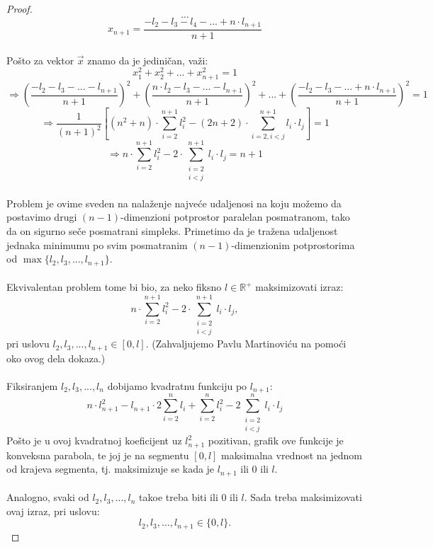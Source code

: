 \documentclass[11pt]{article}
\renewcommand{\vv}{\overrightarrow}
\begin{document}
\begin{proof}
\vspace{3pt}
$$...$$
\vspace{3pt}
$$x_{n+1}=\frac{-l_2-l_3-l_4-...+n\cdot l_{n+1}}{n+1}$$
\\
\indent Po\v sto za vektor $\vv{x}$ znamo da je jedini\v can, va\v zi:
$$x_1^2+ x_2^2+...+x_{n+1}^2=1$$
$$\Rightarrow \left(\frac{-l_2-l_3-...-l_{n+1}}{n+1}\right)^2+\left(\frac{n\cdot l_2-l_3-...-l_{n+1}}{n+1}\right)^2+...+\left(\frac{-l_2-l_3-...+n\cdot l_{n+1}}{n+1}\right)^2=1$$
$$\Rightarrow \frac{1}{(n+1)^2}\left[ (n^2+n)\cdot {\sum_{i=2}^{n+1} {l_i^2}} - (2n+2)\cdot {\sum_{i=2, i<j}^{n+1} {l_i\cdot l_j} } \right]=1$$
$$\Rightarrow n\cdot {\sum_{i=2}^{n+1} {l_i^2}} - 2\cdot {\sum_{\substack{ i=2\\ i<j}}^{n+1} {l_i\cdot l_j} } =n+1$$
\\





\indent Problem je ovime sveden na nala\v zenje najve\' ce udaljenosi na koju mo\v zemo da postavimo drugi $(n-1)$-dimenzioni potprostor paralelan posmatranom, tako da on sigurno se\v ce posmatrani simpleks. Primetimo da je tra\v zena udaljenost jednaka minimumu po svim posmatranim $(n-1)$-dimenzionim potprostorima od $\max{\{l_2, l_3,..., l_{n+1}\}}$.
\\
\\
\indent Ekvivalentan problem tome bi bio, za neko fiksno $l\in \mathbb{R}^+$ maksimizovati izraz:
$$n\cdot {\sum_{i=2}^{n+1} {l_i^2}} - 2\cdot {\sum_{\substack{ i=2\\ i<j}}^{n+1} {l_i\cdot l_j} }, $$
pri uslovu $l_2,l_3,..., l_{n+1}\in [0,l]$. (Zahvaljujemo Pavlu Martinovi\' cu na pomo\' ci oko ovog dela dokaza.)
\\
\\
\indent Fiksiranjem $l_2, l_3,..., l_n$ dobijamo kvadratnu funkciju po $l_{n+1}$:
$$n\cdot l_{n+1}^2-l_{n+1}\cdot 2\sum^{n}_{i=2}l_i+\sum^{n}_{i=2}l_i^2-2\sum^{n}_{\substack{ i=2\\ i<j}}l_i\cdot l_j$$
\indent Po\v sto je u ovoj kvadratnoj koeficijent uz $l_{n+1}^2$ pozitivan, grafik ove funkcije je konveksna parabola, te joj je na segmentu $[0,l]$ maksimalna vrednost na jednom od krajeva segmenta, tj. maksimizuje se kada je $l_{n+1}$ ili 0 ili $l$.
\\
\\
\indent Analogno, svaki od $l_2, l_3,..., l_n$ tako\dj e treba biti ili 0 ili $l$. Sada treba maksimizovati ovaj izraz, pri uslovu:
$$l_2, l_3,..., l_{n+1}\in \{0, l\}.$$


\end{proof}
\end{document}
